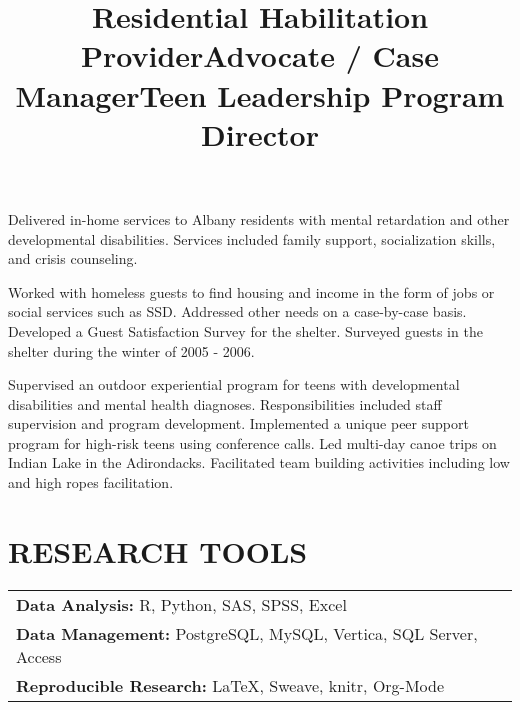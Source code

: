 \documentclass[line, margin, 10pt]{res}
\begin{document}
\begin{resume}
  \title{Residential Habilitation Provider}
  \begin{position}
    Delivered in-home services to Albany residents with mental
    retardation and other developmental disabilities. Services included
    family support, socialization skills, and crisis counseling.
  \end{position}

  \title{Advocate / Case Manager}
  \begin{position}
    Worked with homeless guests to find housing and income in the form
    of jobs or social services such as SSD. Addressed other needs on a case-by-case
    basis. Developed a Guest Satisfaction Survey for the shelter. Surveyed
    guests in the shelter during the winter of 2005 - 2006.
  \end{position}

  \title{Teen Leadership Program Director}
  \begin{position}
    Supervised an outdoor experiential program for teens with
    developmental disabilities and mental health
    diagnoses. Responsibilities included staff supervision and program
    development. Implemented a unique peer support program for
    high-risk teens using conference calls. Led multi-day canoe trips
    on Indian Lake in the Adirondacks. Facilitated team building
    activities including low and high ropes facilitation.
  \end{position}

  \section{RESEARCH TOOLS}

  \begin{tabular} {l l}
    {\bf Data Analysis:} R, Python, SAS, SPSS, Excel\\
    {\bf Data Management:} PostgreSQL, MySQL, Vertica, SQL Server, Access\\
    {\bf Reproducible Research:} \LaTeX, Sweave, knitr, Org-Mode\\
  \end{tabular}


\end{resume}
\end{document}
